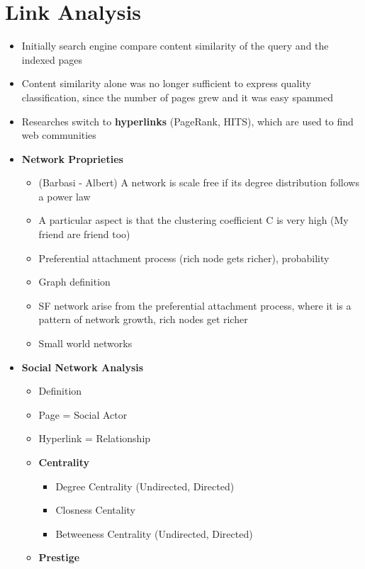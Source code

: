 \chapter{Link Analysis}
\begin{itemize}
    \item Initially search engine compare content similarity of the query and the indexed pages
    \item Content similarity alone was no longer sufficient to express quality classification, since the number of pages grew and it was easy spammed
    \item Researches switch to \textbf{hyperlinks} (PageRank, HITS), which are used to find web communities
    \item \textbf{Network Proprieties}
    \begin{itemize}
        \item (Barbasi - Albert) A network is scale free if its degree distribution follows a power law
        \item A particular aspect is that the clustering coefficient C is very high (My friend are friend too)
        \item Preferential attachment process (rich node gets richer), probability
        \item Graph definition
        \item SF network arise from the preferential attachment process, where it is a pattern of network growth, rich nodes get richer
        \item Small world networks
    \end{itemize}
    \item \textbf{Social Network Analysis}
    \begin{itemize}
        \item Definition
        \item Page = Social Actor
        \item Hyperlink = Relationship
        \item \textbf{Centrality}
        \begin{itemize}
            \item Degree Centrality (Undirected, Directed)
            \item Closness Centality
            \item Betweeness Centrality (Undirected, Directed)
        \end{itemize}
        \item \textbf{Prestige}
        \begin{itemize}

\end{itemize}
\end{itemize}
\end{itemize}
